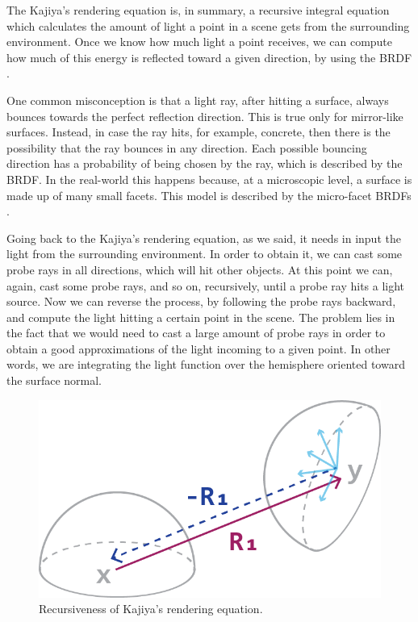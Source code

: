 \documentclass{PoliMi_MasterThesis}
\begin{document}
The Kajiya's rendering equation is, in summary, a recursive integral equation which calculates the amount of light a point in a scene gets from the surrounding environment. Once we know how much light a point receives, we can compute how much of this energy is reflected toward a given direction, by using the BRDF \cite{brdf}.

One common misconception is that a light ray, after hitting a surface, always bounces towards the perfect reflection direction. This is true only for mirror-like surfaces. Instead, in case the ray hits, for example, concrete, then there is the possibility that the ray bounces in any direction. Each possible bouncing direction has a probability of being chosen by the ray, which is described by the BRDF. In the real-world this happens because, at a microscopic level, a surface is made up of many small facets. This model is described by the micro-facet BRDFs \cite{microfacet_brdf}.

Going back to the Kajiya's rendering equation, as we said, it needs in input the light from the surrounding environment. In order to obtain it, we can cast some probe rays in all directions, which will hit other objects. At this point we can, again, cast some probe rays, and so on, recursively, until a probe ray hits a light source. Now we can reverse the process, by following the probe rays backward, and compute the light hitting a certain point in the scene. The problem lies in the fact that we would need to cast a large amount of probe rays in order to obtain a good approximations of the light incoming to a given point. In other words, we are integrating the light function over the hemisphere oriented toward the surface normal. 

\begin{figure}[H]
    \centering
    \includegraphics[width=\textwidth*\real{0.4}]{Images/kajiya_recursive.png}
    \caption{Recursiveness of Kajiya's rendering equation.}
    \label{fig:rendering_equation_recursive_intro}
\end{figure}
\end{document}
